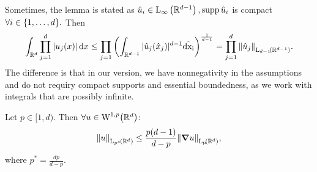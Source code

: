 \documentclass{article}
\begin{document}
\begin{remark}
	Sometimes, the lemma is stated as $\hat{u}_i \in \text{L}_{\infty}\!\,\left({\mathbb R}^{d-1} \right), \operatorname{supp} \hat{u}_i$ is compact $\forall i \in \qty{1,\dots,d}.$ Then
	\[
		\int_{\R^{d}}\prod_{j=1}^d|u_j(x)|\dd{x} \leq \prod_{j=1}\qty(\int_{\R^{d-1}}|\hat{u}_j(\hat{x}_j)|^{d-1}\hat{\dd{x_i}})^{\frac{1}{d-1}} = \prod_{j=1}^d \norm{\hat{u}_j}_{\LpSet[d-1]{\R^{d-1}}}.
	\]
	The difference is that in our version, we have nonnegativity in the assumptions and do not requiry compact supports and essential boundedness, as we work with integrals that are possibly infinite.
\end{remark}

\begin{theorem}
	Let $p \in [1,d).$ Then $\forall u \in \WkpSet[1][p]{\R^d}$:
	\[
		\norm{u}_{\LpSet[p^{*}]{\R^d}}\leq \frac{p(d-1)}{d-p} \norm{\grad u}_{\LpSet{\R^d}}, 
	\]
	where $p^{*}=\frac{dp}{d-p}.$
\end{theorem}
\end{document}
